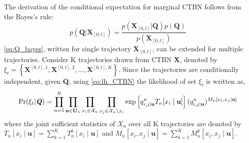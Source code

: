The derivation of the conditional expectation for marginal CTBN follows from the Bayes's rule:
\begin{equation}
p\left(\textbf{Q} | \textbf{X}_{[0,t]}\right)=\frac{p\left(\textbf{X}_{[0,t]} | \textbf{Q}\right) p(\textbf{Q})}{p\left(\textbf{X}_{[0,t]}\right)}
\label{eq:Q_bayes}
\end{equation}
\autoref{eq:Q_bayes}, written for single trajectory $ \textbf{X}_{[0,t]} $, can be extended for multiple trajectories. Consider K trajectories drawn from CTBN \textbf{X}, denoted by $ \xi_t = \left\lbrace \textbf{X}^{[0,t], 1}, \textbf{X}^{[0,t], 2}, ..., \textbf{X}^{[0,t], K} \right\rbrace  $. Since the trajectories are conditionally independent, given \textbf{Q}, using \autoref{eq:lh_CTBN} the likelihood of set $ \xi_t $ is written as,
\begin{align}
\operatorname{Pr}( \xi_t  | \textbf{\textit{Q}} ) = \prod_{n=1}^{N} \prod_{\textbf{u} \in \mathcal{\textbf{U}}_{n}} \prod_{x_i \in \mathcal{X}_{n}} \prod_{x_j \in \mathcal{X}_{n} \backslash x_i}
\exp \left[q_{i,j\mid \textbf{u}}^{n} T_{n}[x_i\mid \textbf{u}]\right] (q_{i,j\mid \textbf{u}}^{n})^{M_{n}[x_i, x_j\mid \textbf{u}]}
\label{eq:lh_dataset_CTBN}
\end{align}
where the joint sufficient statistics of $ X_n $ over all K trajectories are denoted by  $ T_{n}[x_i\mid \textbf{u}] = \sum_{k=1}^{K} T_{n}^k[x_i\mid \textbf{u}] $ and $ M_{n}[x_i, x_j\mid \textbf{u}] =\sum_{k=1}^{K} M_{n}^k[x_i, x_j\mid \textbf{u}]$.

